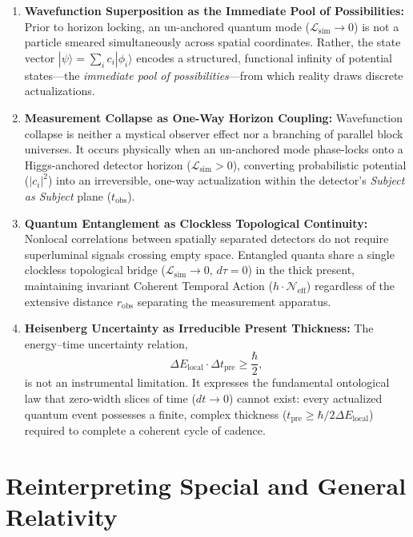 \documentclass[11pt,a4paper]{article}
\begin{document}
\begin{enumerate}
    \item \textbf{Wavefunction Superposition as the Immediate Pool of Possibilities:} Prior to horizon locking, an un-anchored quantum mode ($\mathcal{L}_{\mathrm{sim}} \to 0$) is not a particle smeared simultaneously across spatial coordinates. Rather, the state vector $|\psi\rangle = \sum_i c_i |\phi_i\rangle$ encodes a structured, functional infinity of potential states---the \emph{immediate pool of possibilities}---from which reality draws discrete actualizations.
    \item \textbf{Measurement Collapse as One-Way Horizon Coupling:} Wavefunction collapse is neither a mystical observer effect nor a branching of parallel block universes. It occurs physically when an un-anchored mode phase-locks onto a Higgs-anchored detector horizon ($\mathcal{L}_{\mathrm{sim}} > 0$), converting probabilistic potential ($|c_i|^2$) into an irreversible, one-way actualization within the detector's \emph{Subject as Subject} plane ($t_{\mathrm{obs}}$).
    \item \textbf{Quantum Entanglement as Clockless Topological Continuity:} Nonlocal correlations between spatially separated detectors do not require superluminal signals crossing empty space. Entangled quanta share a single clockless topological bridge ($\mathcal{L}_{\mathrm{sim}} \to 0$, $d\tau = 0$) in the thick present, maintaining invariant Coherent Temporal Action ($h \cdot \mathcal{N}_{\mathrm{eff}}$) regardless of the extensive distance $r_{\mathrm{obs}}$ separating the measurement apparatus.
    \item \textbf{Heisenberg Uncertainty as Irreducible Present Thickness:} The energy--time uncertainty relation,
    \begin{equation}
    \Delta E_{\mathrm{local}} \cdot \Delta t_{\mathrm{pre}} \geq \frac{\hbar}{2},
    \end{equation}
    is not an instrumental limitation. It expresses the fundamental ontological law that zero-width slices of time ($dt \to 0$) cannot exist: every actualized quantum event possesses a finite, complex thickness ($t_{\mathrm{pre}} \geq \hbar / 2\Delta E_{\mathrm{local}}$) required to complete a coherent cycle of cadence.
\end{enumerate}

\section{Reinterpreting Special and General Relativity}
\end{document}

